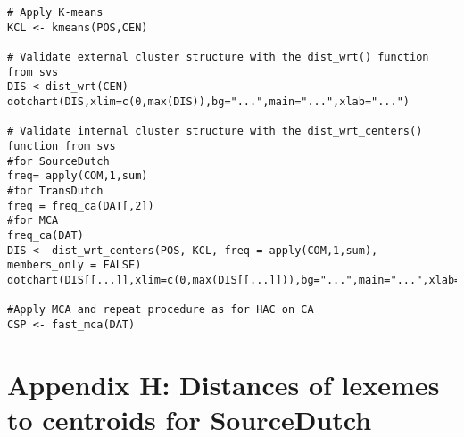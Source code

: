 \begin{lstlisting}[style=RStyle]
# Apply K-means
KCL <- kmeans(POS,CEN)

# Validate external cluster structure with the dist_wrt() function from svs
DIS <-dist_wrt(CEN)
dotchart(DIS,xlim=c(0,max(DIS)),bg="...",main="...",xlab="...")

# Validate internal cluster structure with the dist_wrt_centers() function from svs
#for SourceDutch
freq= apply(COM,1,sum)
#for TransDutch
freq = freq_ca(DAT[,2])
#for MCA
freq_ca(DAT)
DIS <- dist_wrt_centers(POS, KCL, freq = apply(COM,1,sum), members_only = FALSE)
dotchart(DIS[[...]],xlim=c(0,max(DIS[[...]])),bg="...",main="...",xlab="...")

#Apply MCA and repeat procedure as for HAC on CA
CSP <- fast_mca(DAT)
\end{lstlisting}

\section*{Appendix H: Distances of lexemes to centroids for SourceDutch}
\scriptsize
